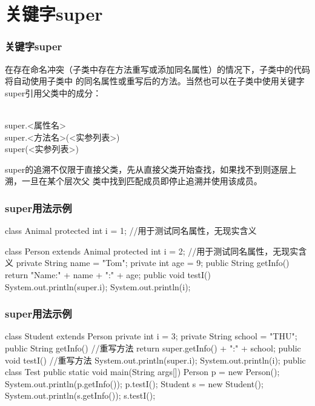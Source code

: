 \section{关键字super} 
\begin{frame}[fragile] %
\frametitle{关键字super}

在存在命名冲突（子类中存在方法重写或添加同名属性）的情况下，子类中的代码将自动使用子类中
的同名属性或重写后的方法。当然也可以在子类中{\Red 使用关键字super引用父类中的成分}：

\\
super.<属性名>
\\
super.<方法名>(<实参列表>)
\\
super(<实参列表>)

super的追溯不仅限于直接父类，先从直接父类开始查找，如果找不到则逐层上溯，一旦在某个层次父
类中找到匹配成员即停止追溯并使用该成员。
\end{frame}

\begin{frame}[fragile] %
\frametitle{super用法示例}

\begin{javaCode}
  class Animal {
    protected int i = 1;   //用于测试同名属性，无现实含义
  }

  class Person extends Animal {
    protected int i = 2;     //用于测试同名属性，无现实含义
    private String name = "Tom";
    private int age = 9;
    public String getInfo() {
      return "Name:" + name + "\tAge:" + age;
    }
    public void testI() {
      System.out.println(super.i);
      System.out.println(i);
    }
  }
  
\end{javaCode}
\end{frame}

\begin{frame}[fragile] %
\frametitle{super用法示例}

\begin{javaCode}
  class Student extends Person {
    private int i = 3;
    private String school = "THU";
    public String getInfo() {       //重写方法
      return super.getInfo() + "\tSchool:" + school;
    }
    public void testI() {       //重写方法
      System.out.println(super.i);
      System.out.println(i);
    }
  }
  public class Test {
    public static void main(String args[]) {
      Person p = new Person();
      System.out.println(p.getInfo());
      p.testI();
      Student s = new Student();
      System.out.println(s.getInfo());
      s.testI();
    }
  }
\end{javaCode}
\end{frame}

